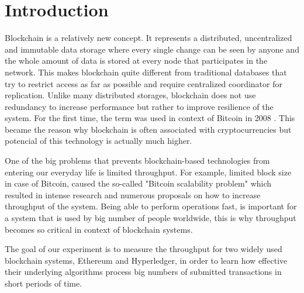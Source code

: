 \section{Introduction}

Blockchain is a relatively new concept. It represents a distributed, uncentralized and immutable data storage where every single change can be seen by anyone and the whole amount of data is stored at every node that participates in the network. This makes blockchain quite different from traditional databases that try to restrict access as far as possible and require centralized coordinator for replication. Unlike many distributed storages, blockchain does not use redundancy to increase performance but rather to improve resilience of the system. For the first time, the term was used in context of Bitcoin in 2008 \cite{bitcoin}. This became the reason why blockchain is often associated with cryptocurrencies but potencial of this technology is actually much higher.

One of the big problems that prevents blockchain-based technologies from entering our everyday life is limited throughput. For example, limited block size in case of Bitcoin, caused the so-called "Bitcoin scalability problem" which resulted in intense research \cite{bitcoin_scaling} and numerous proposals on how to increase throughput of the system. Being able to perform operations fast, is important for a system that is used by big number of people worldwide, this is why throughput becomes so critical in context of blockchain systems.

The goal of our experiment is to measure the throughput for two widely used blockchain systems, Ethereum and Hyperledger, in order to learn how effective their underlying algorithms process big numbers of submitted transactions in short periods of time.
